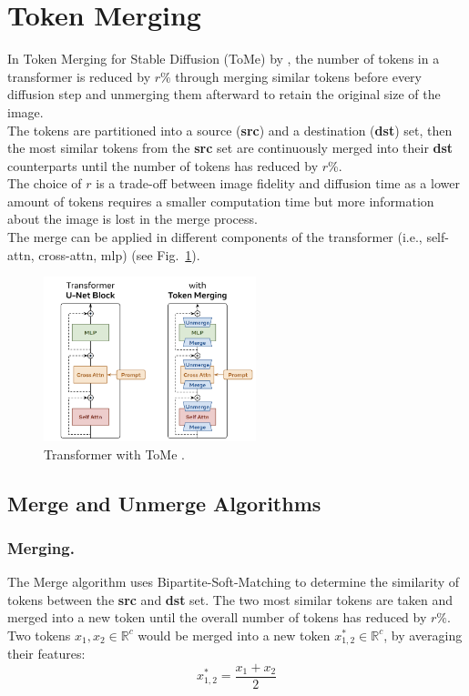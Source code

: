 \section{Token Merging} \label{token_merging}
In Token Merging for Stable Diffusion (ToMe) by \cite{bolya2023tomesd}, the number of tokens in a transformer is reduced by \(r\%\) through merging similar tokens before every diffusion step and unmerging them afterward to retain the original size of the image.\\
The tokens are partitioned into a source (\textbf{src}) and a destination (\textbf{dst}) set, then the most similar tokens from the \textbf{src} set are continuously merged into their \textbf{dst} counterparts until the number of tokens has reduced by \(r\)\%.\\
The choice of \(r\) is a trade-off between image fidelity and diffusion time as a lower amount of tokens requires a smaller computation time but more information about the image is lost in the merge process.\\
The merge can be applied in different components of the transformer (i.e., self-attn, cross-attn, mlp) (see Fig.~\ref{fig:tome}).
\begin{figure}[!htb]
\centering
\includegraphics[width=0.55\textwidth]
{static/transformer_graphic.png}
\caption{Transformer with ToMe \cite[Fig.~2]{bolya2023tomesd}.}
\label{fig:tome}
\end{figure}



\subsection{Merge and Unmerge Algorithms}
\subsubsection*{Merging.} The Merge algorithm uses Bipartite-Soft-Matching to determine the similarity of tokens between the \textbf{src} and \textbf{dst} set. The two most similar tokens are taken and merged into a new token until the overall number of tokens has reduced by \(r\%\).\\
Two tokens \(x_1, x_2 \in \mathbb{R}^c\) would be merged into a new token \(x_{1,2}^* \in \mathbb{R}^c \), by averaging their features: \[x_{1,2}^* = \frac{x_1 + x_2}{2}\]



